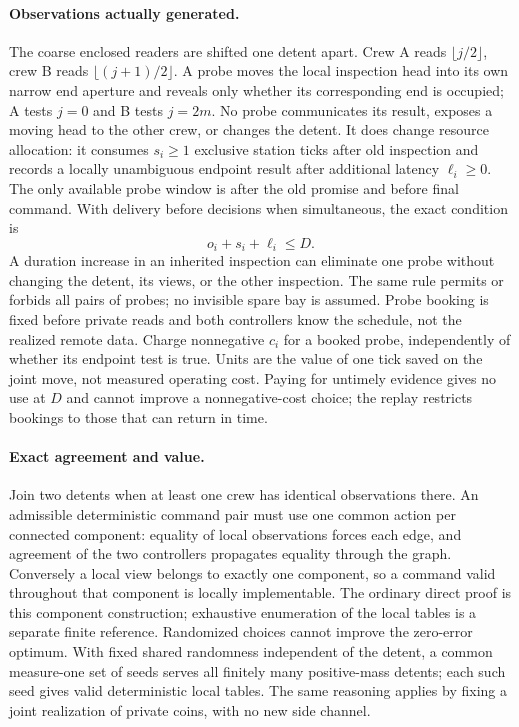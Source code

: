 \documentclass[11pt]{article}
\begin{document}
\paragraph{Observations actually generated.}
The coarse enclosed readers are shifted one detent apart. Crew A reads $\lfloor j/2\rfloor$, crew B reads $\lfloor(j+1)/2\rfloor$. A probe moves the local inspection head into its own narrow end aperture and reveals only whether its corresponding end is occupied; A tests $j=0$ and B tests $j=2m$. No probe communicates its result, exposes a moving head to the other crew, or changes the detent. It does change resource allocation: it consumes $s_i\ge1$ exclusive station ticks after old inspection and records a locally unambiguous endpoint result after additional latency $\ell_i\ge0$. The only available probe window is after the old promise and before final command. With delivery before decisions when simultaneous, the exact condition is
\[
 o_i+s_i+\ell_i\le D.
\]
A duration increase in an inherited inspection can eliminate one probe without changing the detent, its views, or the other inspection. The same rule permits or forbids all pairs of probes; no invisible spare bay is assumed. Probe booking is fixed before private reads and both controllers know the schedule, not the realized remote data. Charge nonnegative $c_i$ for a booked probe, independently of whether its endpoint test is true. Units are the value of one tick saved on the joint move, not measured operating cost. Paying for untimely evidence gives no use at $D$ and cannot improve a nonnegative-cost choice; the replay restricts bookings to those that can return in time.

\paragraph{Exact agreement and value.}
Join two detents when at least one crew has identical observations there. An admissible deterministic command pair must use one common action per connected component: equality of local observations forces each edge, and agreement of the two controllers propagates equality through the graph. Conversely a local view belongs to exactly one component, so a command valid throughout that component is locally implementable. The ordinary direct proof is this component construction; exhaustive enumeration of the local tables is a separate finite reference. Randomized choices cannot improve the zero-error optimum. With fixed shared randomness independent of the detent, a common measure-one set of seeds serves all finitely many positive-mass detents; each such seed gives valid deterministic local tables. The same reasoning applies by fixing a joint realization of private coins, with no new side channel.
\end{document}
